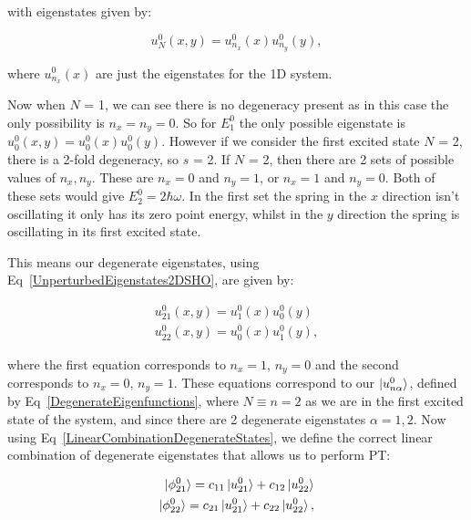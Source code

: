 \noindent with eigenstates given by:

\begin{equation}
    u^0_N(x, y) = u^0_{n_x}(x)u^0_{n_y}(y),
    \label{UnperturbedEigenstates2DSHO}
\end{equation}

\noindent where $u^0_{n_x}(x)$ are just the eigenstates for the 1D system.

\noindent Now when $N$ = 1, we can see there is no degeneracy present as in this case the only possibility is $n_x = n_y = 0$. So for $E^0_1$ the only possible eigenstate is $u^0_0 (x, y) = u^0_0(x)u^0_0(y)$. However if we consider the first excited state $N$ = 2, there is a 2-fold degeneracy, so $s$ = 2. If $N$ = 2, then there are 2 sets of possible values of $n_x, n_y$. These are $n_x = 0$ and $n_y = 1$, or $n_x = 1$ and $n_y = 0$. Both of these sets would give $E^0_2 = 2\hbar \omega$. In the first set the spring in the $x$ direction isn't oscillating it only has its zero point energy, whilst in the $y$ direction the spring is oscillating in its first excited state.

\noindent This means our degenerate eigenstates, using Eq~\ref{UnperturbedEigenstates2DSHO}, are given by:

\begin{eqnarray}
    u^0_{21}(x, y) = u^0_1(x)u^0_0(y) \\
    u^0_{22}(x, y) = u^0_0(x)u^0_1(y),
    \label{DegenerateWavefunctions2DSHO}
\end{eqnarray}

\noindent where the first equation corresponds to $n_x = 1$, $n_y = 0$ and the second corresponds to $n_x = 0$, $n_y = 1$. These equations correspond to our $\ket{u^0_{n\alpha}}$, defined by Eq~\ref{DegenerateEigenfunctions}, where $N \equiv n = 2$ as we are in the first excited state of the system, and since there are 2 degenerate eigenstates $\alpha = 1, 2$. Now using Eq~\ref{LinearCombinationDegenerateStates}, we define the correct linear combination of degenerate eigenstates that allows us to perform PT:

\begin{eqnarray}
    \ket{\phi^0_{21}} = c_{11}\ket{u^0_{21}} + c_{12}\ket{u^0_{22}} \label{LinearCombinationDegenerateStates2DSHO_1} \\
    \ket{\phi^0_{22}} = c_{21}\ket{u^0_{21}} + c_{22}\ket{u^0_{22}},
    \label{LinearCombinationDegenerateStates2DSHO_2}
\end{eqnarray}

